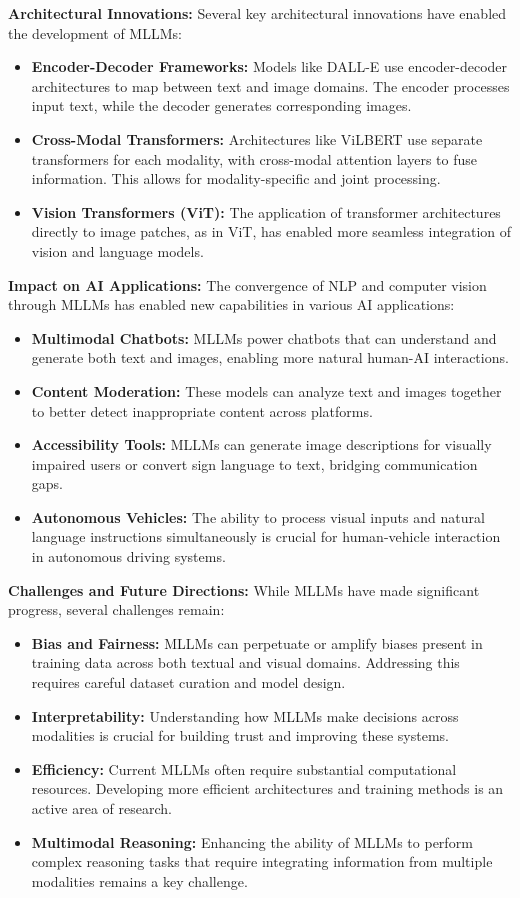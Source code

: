 \textbf{Architectural Innovations:}
Several key architectural innovations have enabled the development of MLLMs:
\begin{itemize}
    \item \textbf{Encoder-Decoder Frameworks:} Models like DALL-E use encoder-decoder architectures to map between text and image domains. The encoder processes input text, while the decoder generates corresponding images.
    \item \textbf{Cross-Modal Transformers:} Architectures like ViLBERT use separate transformers for each modality, with cross-modal attention layers to fuse information. This allows for modality-specific and joint processing.
    \item \textbf{Vision Transformers (ViT):} The application of transformer architectures directly to image patches, as in ViT, has enabled more seamless integration of vision and language models.
\end{itemize}

\textbf{Impact on AI Applications:}
The convergence of NLP and computer vision through MLLMs has enabled new capabilities in various AI applications:
\begin{itemize}
    \item \textbf{Multimodal Chatbots:} MLLMs power chatbots that can understand and generate both text and images, enabling more natural human-AI interactions.
    \item \textbf{Content Moderation:} These models can analyze text and images together to better detect inappropriate content across platforms.
    \item \textbf{Accessibility Tools:} MLLMs can generate image descriptions for visually impaired users or convert sign language to text, bridging communication gaps.
    \item \textbf{Autonomous Vehicles:} The ability to process visual inputs and natural language instructions simultaneously is crucial for human-vehicle interaction in autonomous driving systems.
\end{itemize}

\textbf{Challenges and Future Directions:}
While MLLMs have made significant progress, several challenges remain:
\begin{itemize}
    \item \textbf{Bias and Fairness:} MLLMs can perpetuate or amplify biases present in training data across both textual and visual domains. Addressing this requires careful dataset curation and model design.
    \item \textbf{Interpretability:} Understanding how MLLMs make decisions across modalities is crucial for building trust and improving these systems.
    \item \textbf{Efficiency:} Current MLLMs often require substantial computational resources. Developing more efficient architectures and training methods is an active area of research.
    \item \textbf{Multimodal Reasoning:} Enhancing the ability of MLLMs to perform complex reasoning tasks that require integrating information from multiple modalities remains a key challenge.
\end{itemize}

